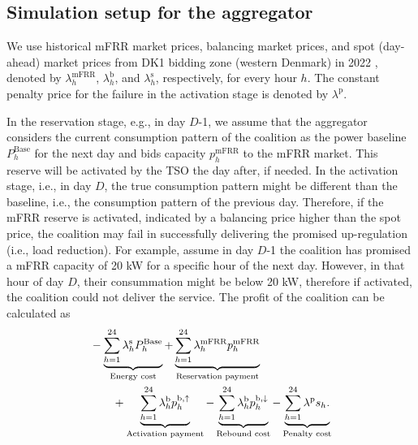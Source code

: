 \documentclass[conference]{IEEEtran}
\begin{document}
\subsection{Simulation setup for the aggregator}
We use historical mFRR market prices, balancing market prices, and spot (day-ahead) market prices from DK1 bidding zone (western Denmark) in 2022 \cite{energinet:energidataservice}, denoted by $\lambda_{h}^{\text{mFRR}}$, $\lambda_{h}^{\text{b}}$, and $\lambda_{h}^{\text{s}}$, respectively,  for every hour $h$. The constant penalty price for the failure in the activation stage is denoted by $\lambda^{\text{p}}$. %

In the reservation stage, e.g., in day $D$-1, we assume that the aggregator considers the current consumption pattern of the coalition as the power baseline $P^{\text{Base}}_{h}$ for the next day  and bids capacity $p^{\text{mFRR}}_{h}$ to the mFRR market. This reserve will be  activated by the TSO the day after, if needed. In the activation stage, i.e., in day $D$, the true consumption pattern might be different than the baseline, i.e., the consumption pattern of the previous day. Therefore, if the mFRR reserve is activated, indicated by a balancing price higher than the spot price, the coalition may fail in successfully delivering the promised up-regulation (i.e., load reduction). For example, assume in day $D$-1 the coalition has promised a mFRR capacity of 20 kW for a specific hour of the next day. However, in that hour of day $D$, their consummation might be below 20 kW, therefore if activated, the coalition could not deliver the service. The profit of the coalition can be  calculated as
%
\begin{align}\label{eq:mFRRObjective}
     &  - \underbrace{\sum_{h=1}^{24} \lambda^{\text{s}}_{h}P^{\text{Base}}_{h}}_{\textrm{Energy cost}} + \underbrace{\sum_{h=1}^{24}\lambda_{h}^{\text{mFRR}} p^{\text{mFRR}}_{h}}_{\textrm{Reservation payment}}  \notag \\ & \quad \quad + \underbrace{\sum_{h=1}^{24}  \lambda_{h}^{\text{b}} p^{\text{b},\uparrow}_{h}}_{\textrm{Activation payment}} - \underbrace{\sum_{h=1}^{24}  \lambda_{h}^{\text{b}} p^{\text{b},\downarrow}_{h}}_{\textrm{Rebound cost}} - \underbrace{ \sum_{h=1}^{24}  \lambda^{\text{p}}s_{h}.}_{\textrm{Penalty cost}}
\end{align}
\end{document}

